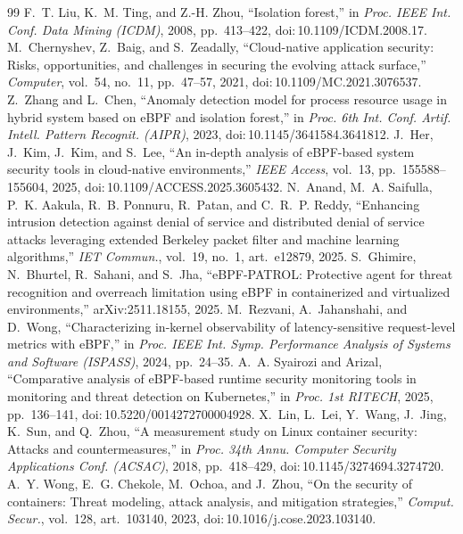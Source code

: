 \documentclass[10pt,conference]{IEEEtran}
\begin{document}
\balance
\begin{thebibliography}{99}
 F.~T. Liu, K.~M. Ting, and Z.-H. Zhou, ``Isolation forest,'' in \emph{Proc. IEEE Int. Conf. Data Mining (ICDM)}, 2008, pp.~413--422, doi:\,10.1109/ICDM.2008.17.
 M.~Chernyshev, Z.~Baig, and S.~Zeadally, ``Cloud-native application security: Risks, opportunities, and challenges in securing the evolving attack surface,'' \emph{Computer}, vol.~54, no.~11, pp.~47--57, 2021, doi:\,10.1109/MC.2021.3076537.
 Z.~Zhang and L.~Chen, ``Anomaly detection model for process resource usage in hybrid system based on eBPF and isolation forest,'' in \emph{Proc. 6th Int. Conf. Artif. Intell. Pattern Recognit. (AIPR)}, 2023, doi:\,10.1145/3641584.3641812.
 J.~Her, J.~Kim, J.~Kim, and S.~Lee, ``An in-depth analysis of eBPF-based system security tools in cloud-native environments,'' \emph{IEEE Access}, vol.~13, pp.~155588--155604, 2025, doi:\,10.1109/ACCESS.2025.3605432.
 N.~Anand, M.~A. Saifulla, P.~K. Aakula, R.~B. Ponnuru, R.~Patan, and C.~R.~P. Reddy, ``Enhancing intrusion detection against denial of service and distributed denial of service attacks leveraging extended Berkeley packet filter and machine learning algorithms,'' \emph{IET Commun.}, vol.~19, no.~1, art.~e12879, 2025.
 S.~Ghimire, N.~Bhurtel, R.~Sahani, and S.~Jha, ``eBPF-PATROL: Protective agent for threat recognition and overreach limitation using eBPF in containerized and virtualized environments,'' arXiv:2511.18155, 2025.
 M.~Rezvani, A.~Jahanshahi, and D.~Wong, ``Characterizing in-kernel observability of latency-sensitive request-level metrics with eBPF,'' in \emph{Proc. IEEE Int. Symp. Performance Analysis of Systems and Software (ISPASS)}, 2024, pp.~24--35.
 A.~A. Syairozi and Arizal, ``Comparative analysis of eBPF-based runtime security monitoring tools in monitoring and threat detection on Kubernetes,'' in \emph{Proc. 1st RITECH}, 2025, pp.~136--141, doi:\,10.5220/0014272700004928.
 X.~Lin, L.~Lei, Y.~Wang, J.~Jing, K.~Sun, and Q.~Zhou, ``A measurement study on Linux container security: Attacks and countermeasures,'' in \emph{Proc. 34th Annu. Computer Security Applications Conf. (ACSAC)}, 2018, pp.~418--429, doi:\,10.1145/3274694.3274720.
 A.~Y. Wong, E.~G. Chekole, M.~Ochoa, and J.~Zhou, ``On the security of containers: Threat modeling, attack analysis, and mitigation strategies,'' \emph{Comput. Secur.}, vol.~128, art.~103140, 2023, doi:\,10.1016/j.cose.2023.103140.

\end{thebibliography}
\end{document}
